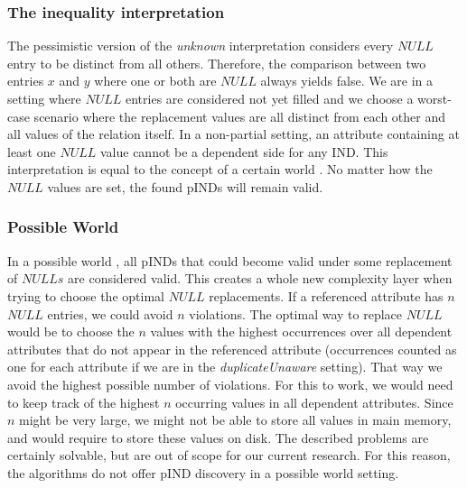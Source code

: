 \subsubsection{The \textbf{inequality} interpretation}
The pessimistic version of the \textit{unknown} interpretation considers every $NULL$ entry to be distinct from all others. Therefore, the comparison between two entries $x$ and $y$ where one or both are $NULL$ always yields false. We are in a setting where $NULL$ entries are considered not yet filled and we choose a worst-case scenario where the replacement values are all distinct from each other and all values of the relation itself. In a non-partial setting, an attribute containing at least one $NULL$ value cannot
be a dependent side for any IND. This interpretation is equal to the concept of a certain world \cite{kohler2013possible}. No matter how the $NULL$ values are set, the found pINDs will remain valid.

\subsubsection{\textbf{Possible World}}
In a possible world \cite{kohler2013possible}, all pINDs that could become valid under some replacement of $NULLs$ are considered valid. This creates a whole new complexity layer when trying to choose the optimal $NULL$ replacements. If a referenced attribute has $n$ $NULL$ entries, we could avoid $n$ violations. The optimal way to replace $NULL$ would be to choose the $n$ values with the highest occurrences over all dependent attributes that do not appear in the referenced attribute (occurrences counted as one for each attribute if we are in the \textit{duplicateUnaware} setting). That way we avoid the highest possible number of violations. For this to work, we would need to keep track of the highest $n$ occurring values in all dependent attributes. Since $n$ might be very large, we might not be able to store all values in main memory, and would require to store these values on disk. The described problems are certainly solvable, but are out of scope for our current research. For this reason, the algorithms do not offer pIND discovery in a possible world setting.